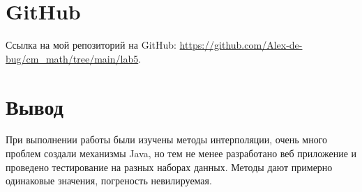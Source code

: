 \documentclass{article}
\begin{document}
\section{GitHub}
Ссылка на мой репозиторий на GitHub: \url{https://github.com/Alex-de-bug/cm_math/tree/main/lab5}.

\section{Вывод}
При выполнении работы были изучены методы интерполяции, очень много проблем создали механизмы Java, но тем не менее разработано веб приложение и проведено тестирование на разных наборах данных. Методы дают примерно одинаковые значения, погреность невилируемая.
\end{document}
